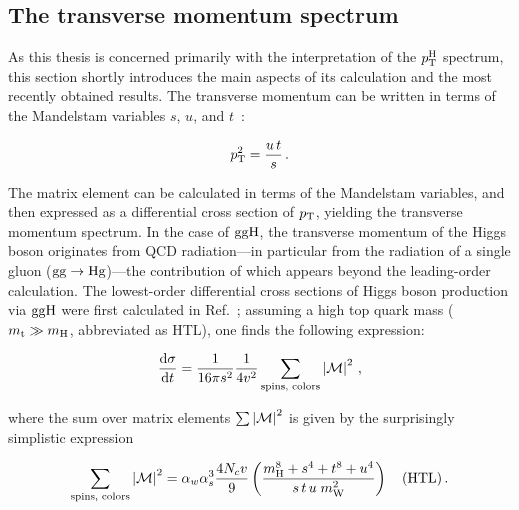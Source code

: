 


\subsection{The transverse momentum spectrum}

As this thesis is concerned primarily with the interpretation of the $p_\mathrm{T}^\mathrm{H}$ spectrum, this section shortly introduces the main aspects of its calculation and the most recently obtained results.
% 
The transverse momentum can be written in terms of the Mandelstam variables $s$, $u$, and $t$~\cite{peskin}:
% 
\begin{linenomath*}
\begin{equation}
p_\mathrm{T}^2 = \frac{u \, t}{s}
\,.
\end{equation}
\end{linenomath*}
% 
The matrix element can be calculated in terms of the Mandelstam variables, and then expressed as a differential cross section of $p_\mathrm{T}$, yielding the transverse momentum spectrum.
% 
In the case of $\mathrm{g}\mathrm{g}\mathrm{H}$, the transverse momentum of the Higgs boson originates from QCD radiation---in particular from the radiation of a single gluon ($\mathrm{g}\mathrm{g}\to\mathrm{H}\mathrm{g}$)---the contribution of which appears beyond the leading-order calculation.
% 
The lowest-order differential cross sections of Higgs boson production via $\mathrm{g}\mathrm{g}\mathrm{H}$ were first calculated in Ref.~\cite{Ellis:1987xu}; assuming a high top quark mass ($m_{\mathrm{t}} \gg m_{\mathrm{H}}$, abbreviated as HTL), one finds the following expression:
% 
\begin{linenomath*}
\begin{equation}
\frac{\mathrm{d}\sigma}{\mathrm{d}t} =
\frac{1}{16\pi s^2} \frac{1}{4v^2}
\sum_\text{spins, colors} \left| \mathcal{M} \right |^2
\,,
\end{equation}
\end{linenomath*}
% 
where the sum over matrix elements $\sum\left| \mathcal{M} \right |^2$ is given by the surprisingly simplistic expression
% 
\begin{linenomath*}
\begin{equation}
\sum_\text{spins, colors} \abs{\mathcal{M}}^2
= \alpha_w \alpha_s^3 \frac{4 N_c v}{9} %
\left(
    \frac{\mh^8 + s^4 + t^8 + u^4}{ s \, t \, u \; m_\wboson^2 }
    \right)
\quad \text{(HTL)}
\,.
\end{equation}
\end{linenomath*}
